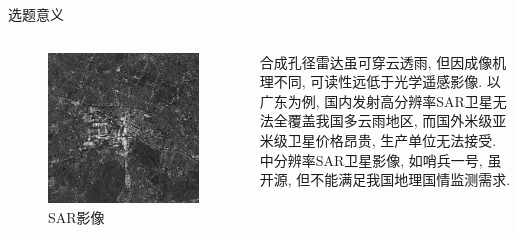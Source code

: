\begin{frame}{选题意义}
    \begin{columns}
        \begin{figure}
            \centering
            \includegraphics[width=\textwidth]{pic/chap0102.jpg}
            \caption{SAR影像}
            \label{fig:0102}
        \end{figure}

        合成孔径雷达虽可穿云透雨, 但因成像机理不同, 可读性远低于光学遥感影像. 以广东为例, 国内发射高分辨率SAR卫星无法全覆盖我国多云雨地区, 而国外米级亚米级卫星价格昂贵, 生产单位无法接受. 中分辨率SAR卫星影像, 如哨兵一号, 虽开源, 但不能满足我国地理国情监测需求.
    \end{columns}
\end{frame}

